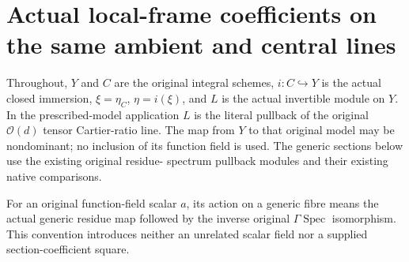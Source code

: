 \section{Actual local-frame coefficients on the same ambient and central lines}

Throughout, $Y$ and $C$ are the original integral schemes,
$i:C\hookrightarrow Y$ is the actual closed immersion, $\xi=\eta_C$,
$\eta=i(\xi)$, and $L$ is the actual invertible module on $Y$.
In the prescribed-model application $L$ is the literal pullback of the
original $\mathcal O(d)$ tensor Cartier-ratio line. The map from $Y$ to
that original model may be nondominant; no inclusion of its function field
is used. The generic sections below use the existing original residue-
spectrum pullback modules and their existing native comparisons.

For an original function-field scalar $a$, its action on a generic fibre
means the actual generic residue map followed by the inverse original
$\Gamma\operatorname{Spec}$ isomorphism. This convention introduces neither
an unrelated scalar field nor a supplied section-coefficient square.

